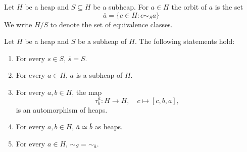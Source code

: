 \documentclass{svmult}
\begin{document}
Let $H$ be a heap and $S\subseteq H$ be a subheap. For $a\in H$ 
the orbit of $a$ is the set
\[
\overline{a}=\{c\in H:c\sim_S a\}
\]
We write $H/S$ to denote the set
of equivalence classes.

\begin{theorem}
    Let $H$ be a heap and $S$ be a subheap of $H$. The following statements hold:
    \begin{enumerate}
        \item For every $s\in S$, $\overline{s}=S$. 
        \item For every $a\in H$, $\overline{a}$ is a subheap of $H$.
        \item For every $a,b\in H$, 
        the map
        \[
        \tau_b^a\colon H\to H,\quad
        c\mapsto [c,b,a],
        \]
        is an automorphism of heaps. 
        \item For every $a,b\in H$, 
        $\overline{a}\simeq\overline{b}$ as heaps. 
        \item For every $a\in H$, $\sim_S=\sim_{\overline{a}}$. 
    \end{enumerate}
\end{theorem}
\end{document}
